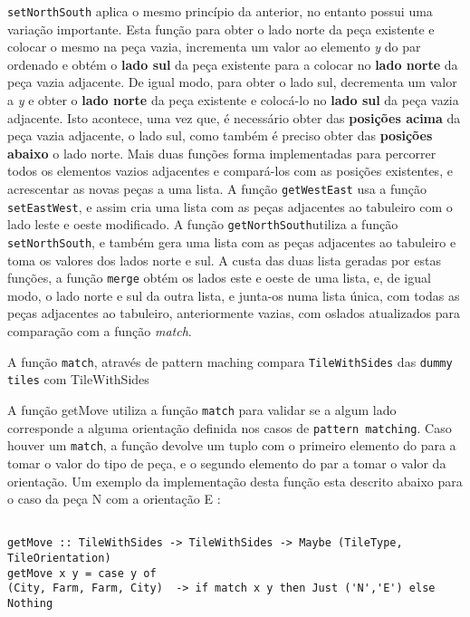 \texttt{setNorthSouth} aplica o mesmo princípio da anterior, no entanto possui uma variação importante.
Esta função para obter o lado norte da peça existente e colocar o mesmo na peça vazia, incrementa um valor
ao elemento \emph{y} do par ordenado e obtém o \textbf{lado sul} da peça existente para a colocar no
\textbf{lado norte} da peça vazia adjacente. De igual modo, para obter o lado sul, decrementa um valor a
\emph{y} e obter o \textbf{lado norte} da peça existente e colocá-lo no \textbf{lado sul} da peça vazia
adjacente. Isto acontece, uma vez que, é necessário obter das \textbf{posições acima} da peça vazia
adjacente, o lado sul, como também é preciso obter das \textbf{posições abaixo} o lado norte. Mais duas
funções forma implementadas para percorrer todos os elementos vazios adjacentes e compará-los com as
posições existentes, e acrescentar as novas peças a uma lista. A função \texttt{getWestEast} usa a
função \texttt{setEastWest}, e assim cria uma lista com as peças adjacentes ao tabuleiro com o lado leste e
oeste modificado. A função \texttt{getNorthSouth}utiliza a função \texttt{setNorthSouth}, e também gera
uma lista com as peças adjacentes ao tabuleiro e toma os valores dos lados norte e sul. A custa das duas
lista geradas por estas funções, a função \texttt{merge} obtém os lados este e oeste de uma lista, e, de
igual modo, o lado norte e sul da outra lista, e junta-os numa lista única, com todas as peças adjacentes ao
tabuleiro, anteriormente vazias, com oslados atualizados para comparação com a função \emph{match}.



%
%


	A função \texttt{match}, através de pattern maching compara \texttt{TileWithSides} das \texttt{dummy tiles} com TileWithSides 

A função getMove utiliza a função \texttt{match} para validar se a algum lado corresponde a alguma orientação definida
nos casos de \texttt{pattern matching}. Caso houver um \texttt{match}, a função devolve um tuplo com o primeiro elemento do para a tomar o valor do tipo de peça,
e o segundo elemento do par a tomar o valor da orientação. Um exemplo da implementação desta função esta
descrito abaixo para o caso da peça N com a orientação E :

\begin{verbatim}

getMove :: TileWithSides -> TileWithSides -> Maybe (TileType, TileOrientation)
getMove x y = case y of 
(City, Farm, Farm, City)  -> if match x y then Just ('N','E') else Nothing
\end{verbatim}
 

